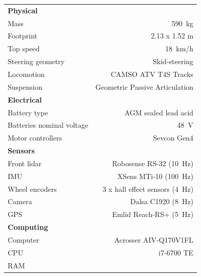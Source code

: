 \begin{figure} [h!]
	\centering
	\begin{minipage}[b]{1.0\linewidth}
		\centering
		\begin{tabular}[b]{l r} \toprule
			\textbf{Physical}         &                                      \\
			Mass                      & \SI{590}{kg}                         \\
			Footprint                 & 2.13 x 1.52 m                        \\
			Top speed                 & \SI{18}{km/h}                        \\
			Steering geometry         & Skid-steering                        \\
			Locomotion                & CAMSO ATV T4S Tracks                 \\
			Suspension                & Geometric Passive Articulation       \\
			\midrule
			\textbf{Electrical}                                              \\
			Battery type              & AGM sealed lead acid                 \\
			Batteries nominal voltage & \SI{48}{V}                           \\
			Motor controllers         & Sevcon Gen4                          \\
			\midrule
			\textbf{Sensors}                                                 \\
			Front lidar               & Robosense RS-32 (\SI{10}{Hz})        \\
			\ac{IMU}                  & XSens MTi-10 (\SI{100}{Hz})          \\
			Wheel encoders            & 3 x hall effect sensors (\SI{4}{Hz}) \\
			Camera                    & Dalsa C1920 (\SI{8}{Hz})             \\
			\ac{GPS}                  & Emlid Reach-RS+ (\SI{5}{Hz})         \\
			\midrule
			\textbf{Computing}                                               \\
			Computer                  & Acrosser AIV-Q170V1FL                \\
			CPU                       & i7-6700 TE                           \\
			RAM                                                              \\

\end{tabular}
\end{minipage}
\end{figure}

